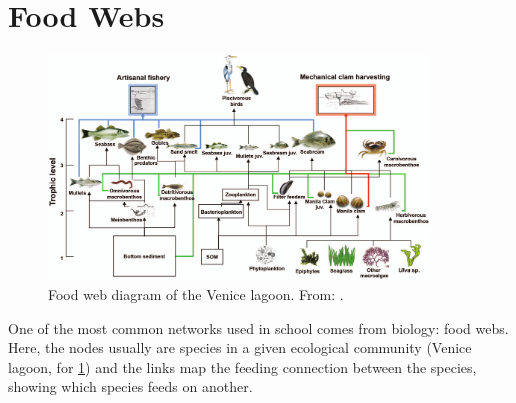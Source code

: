 \section{Food Webs}

    \begin{figure}[H]
        \centering
        \includegraphics[width=0.9\textwidth]{images/GEN-009.png}

        \caption{Food web diagram of the Venice lagoon. From: \cite{heymans}.}
        \label{fig:food-web}
    \end{figure}

    One of the most common networks used in school comes from biology: food webs. Here, the nodes usually are species in a given ecological community (Venice lagoon, for \cref{fig:food-web}) and the links map the feeding connection between the species, showing which species feeds on another.
